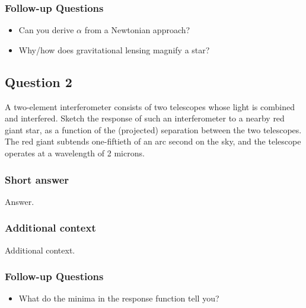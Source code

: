 \documentclass[a4paper,10pt]{article}
\begin{document}
\subsubsection{Follow-up Questions}

\begin{itemize}
    \item Can you derive $\alpha$ from a Newtonian approach?
    \item Why/how does gravitational lensing magnify a star?
\end{itemize}


\newpage
\subsection{Question 2}

A two-element interferometer consists of two telescopes whose light is combined and interfered. Sketch the response of such an interferometer to a nearby red giant star, as a function of the (projected) separation between the two telescopes. The red giant subtends one-fiftieth of an arc second on the sky, and the telescope operates at a wavelength of 2 microns.

\subsubsection{Short answer}

Answer.

\subsubsection{Additional context}

Additional context.

\subsubsection{Follow-up Questions}

\begin{itemize}
    \item What do the minima in the response function tell you?
\end{itemize}

\end{document}

